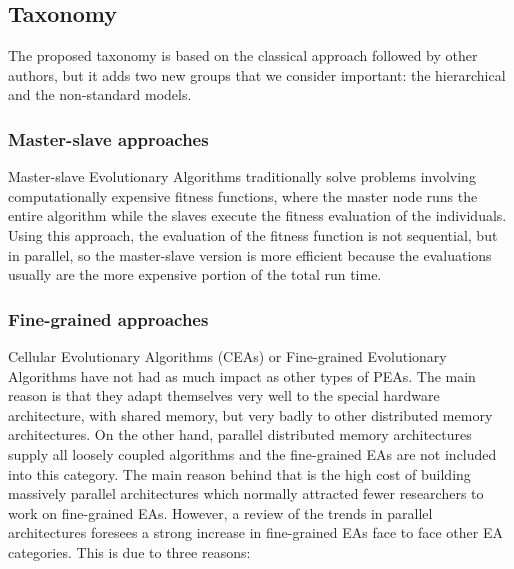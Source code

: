 \documentclass{article}
\begin{document}
\subsection{Taxonomy} %

The proposed taxonomy is based on the classical approach followed by other authors, but it adds two new groups that we consider important: the hierarchical and the non-standard models.

\subsubsection{Master-slave approaches}
Master-slave Evolutionary Algorithms traditionally solve problems
involving computationally expensive fitness functions, where the
master node runs the entire algorithm while the slaves execute the
fitness evaluation of the individuals. Using this approach, the
evaluation of the fitness function is not sequential, but in parallel,
so the master-slave version is more efficient because the evaluations
usually are the more expensive portion of the total run time.

\subsubsection{Fine-grained approaches}
Cellular Evolutionary Algorithms (CEAs) or Fine-grained Evolutionary
Algorithms have not had as much impact as other types of PEAs. The
main reason is that they adapt themselves very well to the special
hardware architecture, with shared memory, but very badly to other
distributed memory architectures. On the other hand, parallel
distributed memory architectures supply all loosely coupled algorithms
and the fine-grained EAs are not included into this category. The main
reason behind that is the high cost of building massively parallel
architectures which normally attracted fewer researchers to work on
fine-grained EAs. However, a review of the trends in parallel
architectures foresees a strong increase in fine-grained EAs face to
face other EA categories. This is due to three reasons:  
\end{document}
